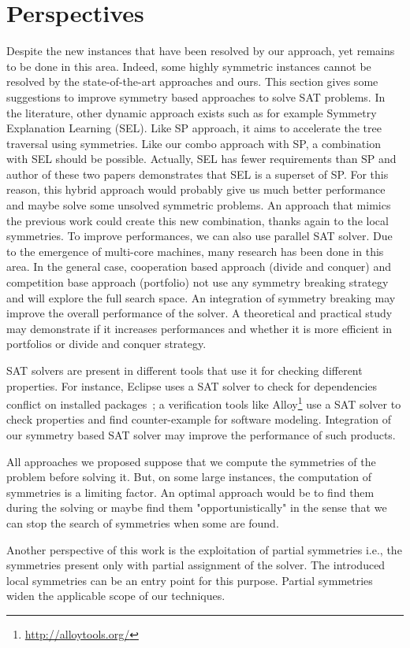 \section{Perspectives}
Despite the new instances that have been resolved by our approach, yet remains to be done in this area.
Indeed, some highly symmetric instances cannot be resolved by the state-of-the-art approaches and ours.
This section gives some suggestions to improve symmetry based approaches to solve SAT problems.
In the literature, other dynamic approach exists such as for example Symmetry Explanation Learning (SEL)\cite{devriendt2017symmetric}. Like SP approach, it aims to accelerate the tree traversal using symmetries.
Like our combo approach with SP, a combination with SEL should be possible.
Actually, SEL has fewer requirements than SP and author of these two papers demonstrates that
SEL is a superset of SP. For this reason, this hybrid approach would probably give us much better performance and 
maybe solve some unsolved symmetric problems.
An approach that mimics the previous work could create this new combination, thanks again to the local symmetries.
To improve performances, we can also use parallel SAT solver. Due to the emergence of multi-core machines,
many research has been done in this area. In the general case, cooperation based approach (divide and conquer) and
competition base approach (portfolio)  not use any symmetry breaking strategy and will explore the full search space.
An integration of symmetry breaking may improve the overall performance of the solver.
A theoretical and practical study may demonstrate if it increases performances and whether it is more efficient in 
portfolios or divide and conquer strategy.

SAT solvers are present in different tools that use it for checking different properties. For instance, 
 Eclipse uses a SAT solver to check for dependencies conflict on installed packages~\cite{le2008sat};
a verification tools like Alloy\footnote{\url{http://alloytools.org/}} use a SAT solver to check properties and find
counter-example for software modeling. Integration of our symmetry based SAT solver may improve the performance of such products.

All approaches we proposed suppose that we compute the symmetries of the problem before solving it.
But, on some large instances, the computation of symmetries is a limiting factor. An optimal approach
would be to find them during the solving or maybe find them "opportunistically" in the sense that we can stop the search of symmetries when some are found.

Another perspective of this work is the exploitation of partial symmetries i.e., 
the symmetries present only with partial assignment of the solver. The introduced local symmetries can be an entry
point for this purpose. Partial symmetries widen the applicable scope of our techniques.



 
